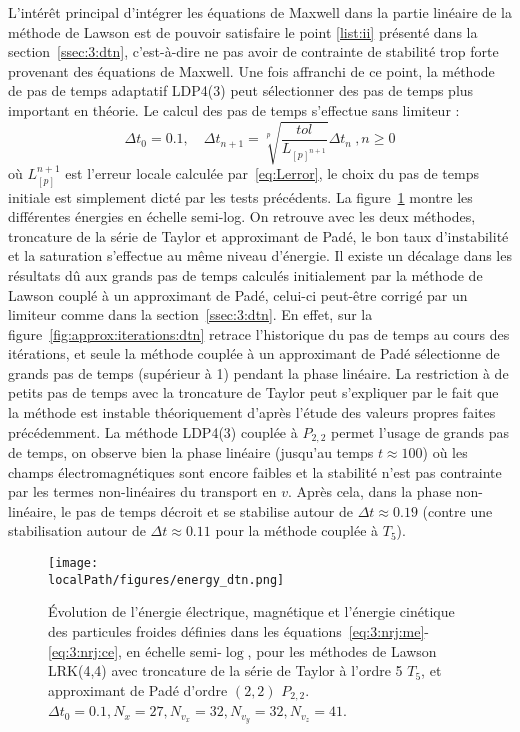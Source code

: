 L'intérêt principal d'intégrer les équations de Maxwell dans la partie linéaire de la méthode de Lawson est de pouvoir satisfaire le point \ref{list:ii} présenté dans la section~\ref{ssec:3:dtn}, c'est-à-dire ne pas avoir de contrainte de stabilité trop forte provenant des équations de Maxwell. Une fois affranchi de ce point, la méthode de pas de temps adaptatif LDP4(3) peut sélectionner des pas de temps plus important en théorie. Le calcul des pas de temps s'effectue sans limiteur :
$$
  \Delta t_0 = 0.1,\quad \Delta t_{n+1} = \sqrt[p]{\frac{tol}{L_{[p]^{n+1}}}}\Delta t_n\ ,n\geq 0
$$
où $L_{[p]}^{n+1}$ est l'erreur locale calculée par~\ref{eq:Lerror}, le choix du pas de temps initiale est simplement dicté par les tests précédents. La figure~\ref{fig:approx:energies:dtn} montre les différentes énergies en échelle semi-log. On retrouve avec les deux méthodes, troncature de la série de Taylor et approximant de Padé, le bon taux d'instabilité et la saturation s'effectue au même niveau d'énergie. Il existe un décalage dans les résultats dû aux grands pas de temps calculés initialement par la méthode de Lawson couplé à un approximant de Padé, celui-ci peut-être corrigé par un limiteur comme dans la section~\ref{ssec:3:dtn}. En effet, sur la figure~\ref{fig:approx:iterations:dtn} retrace l'historique du pas de temps au cours des itérations, et seule la méthode couplée à un approximant de Padé sélectionne de grands pas de temps (supérieur à 1) pendant la phase linéaire. La restriction à de petits pas de temps avec la troncature de Taylor peut s'expliquer par le fait que la méthode est instable théoriquement d'après l'étude des valeurs propres faites précédemment. La méthode LDP4(3) couplée à $P_{2,2}$ permet l'usage de grands pas de temps, on observe bien la phase linéaire (jusqu'au temps $t\approx 100$) où les champs électromagnétiques sont encore faibles et la stabilité n'est pas contrainte par les termes non-linéaires du transport en $v$. Après cela, dans la phase non-linéaire, le pas de temps décroit et se stabilise autour de $\Delta t\approx 0.19$ (contre une stabilisation autour de $\Delta t\approx 0.11$ pour la méthode couplée à $T_5$).

\begin{figure}[h]
  \centering
  \texttt{[image: \\localPath/figures/energy\_dtn.png]}
  \caption{Évolution de l'énergie électrique, magnétique et l'énergie cinétique des particules froides définies dans les équations~\ref{eq:3:nrj:me}-\ref{eq:3:nrj:ce}, en échelle semi-$\log$, pour les méthodes de Lawson LRK(4,4) avec troncature de la série de Taylor à l'ordre 5 $T_5$, et approximant de Padé d'ordre $(2,2)$ $P_{2,2}$. $\Delta t_0 = 0.1, N_x=27, N_{v_x}=32, N_{v_y}=32, N_{v_z}=41$.}
  \label{fig:approx:energies:dtn}
\end{figure}

